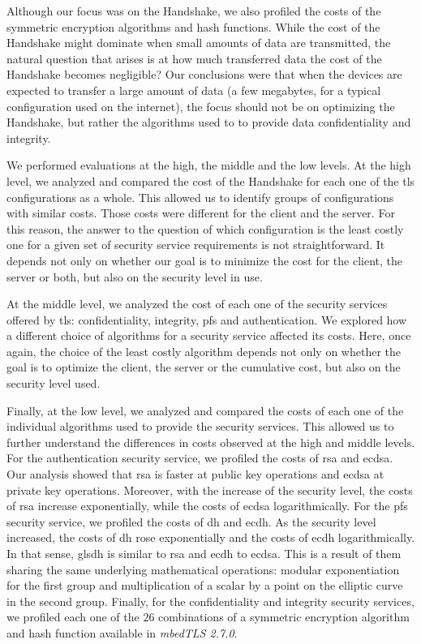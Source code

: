 Although our focus was on the Handshake, we also profiled the costs of the symmetric encryption algorithms and hash functions. While the cost of the
Handshake might dominate when small amounts of data are transmitted, the natural question that arises is at how much transferred data the cost of
the Handshake becomes negligible? Our conclusions were that when the devices are expected to transfer a large amount of data 
(a few megabytes, for a typical configuration used on the internet), the focus should not be on
optimizing the Handshake, but rather the algorithms used to to provide data confidentiality and integrity.

We performed evaluations at the high, the middle and the low levels. At the high level, we analyzed and compared the cost of the Handshake for each 
one of the \gls{tls} configurations as a whole. This allowed us to identify groups of configurations with similar costs. Those costs were different for the client and the server. For this reason,
the answer to the question of which configuration is the least costly one for a given set of security service requirements is not straightforward. 
It depends not only on whether our goal is to minimize the cost for the client, the server or both, but also on the security level in use.

At the middle level, we analyzed the cost of each one of the security services offered by \gls{tls}: confidentiality, integrity, \gls{pfs}
and authentication. We explored how a different choice of algorithms for a security service affected its costs. Here, once again, the choice
of the least costly algorithm depends not only on whether the goal is to optimize the client, the server or the cumulative cost, but also on the
security level used.

Finally, at the low level, we analyzed and compared the costs of each one of the individual algorithms used to provide the security services. This allowed us
to further understand the differences in costs observed at the high and middle levels.
For the authentication security service, we profiled the costs of \gls{rsa} and \gls{ecdsa}. Our analysis showed that \gls{rsa} is faster at public key operations
and \gls{ecdsa} at private key operations. Moreover, with the increase of the security level, the costs of \gls{rsa} increase exponentially, while the
costs of \gls{ecdsa} logarithmically. For the \gls{pfs} security service, we profiled the costs of \gls{dh} and \gls{ecdh}. As the security level increased,
the costs of \gls{dh} rose exponentially and the costs of \gls{ecdh} logarithmically. In that sense, gls{dh} is similar
to \gls{rsa} and \gls{ecdh} to \gls{ecdsa}. This is a result of them sharing the same underlying mathematical operations: modular exponentiation for the first group and
multiplication of a scalar by a point on the elliptic curve in the second group.
Finally, for the confidentiality and integrity security services, we profiled each one of the $26$ combinations of a symmetric encryption algorithm and hash function available in \textit{mbedTLS 2.7.0}.

